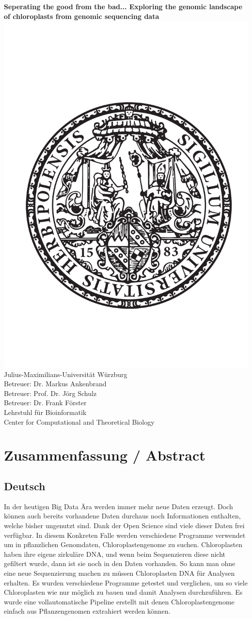 \documentclass{scrartcl}
\begin{document}
\begin{center}
\textbf{Seperating the good from the bad... Exploring the genomic landscape of chloroplasts from genomic sequencing data}
\includegraphics[width=.5\linewidth]{./neuSIEGEL.pdf}\\[1cm]
{\large Julius-Maximilians-Universität Würzburg}\\
{\large Betreuer: Dr. Markus Ankenbrand}\\
{\large Betreuer: Prof. Dr. Jörg Schulz}\\
{\large Betreuer: Dr. Frank Förster}\\
{\large Lehrstuhl für Bioinformatik}\\
{\large Center for Computational and Theoretical Biology}
\setcounter{page}{1}
\clearpage
\end{center}
\tableofcontents
\clearpage
\section{Zusammenfassung / Abstract}
\label{sec-1}
\subsection{Deutsch}
\label{sec-1-1}
In der heutigen Big Data Ära werden immer mehr neue Daten erzeugt. Doch können auch bereits vorhandene Daten durchaus noch Informationen enthalten, welche bisher ungenutzt sind.
Dank der Open Science sind viele dieser Daten frei verfügbar. In diesem Konkreten Falle werden verschiedene Programme verwendet um in pflanzlichen Genomdaten, Chloroplastengenome zu 
suchen. Chloroplasten haben ihre eigene zirkuläre DNA, und wenn beim Sequenzieren diese nicht gefiltert wurde, dann ist sie noch in den Daten vorhanden. So kann man ohne 
eine neue Sequenzierung machen zu müssen Chloroplasten DNA für Analysen erhalten. Es wurden verschiedene Programme getestet und verglichen, um so viele Chloroplasten 
wie nur möglich zu bauen und damit Analysen durchzuführen. Es wurde eine vollautomatische Pipeline erstellt mit denen Chloroplastengenome einfach aus Pflanzengenomen
extrahiert werden können. 
\end{document}
